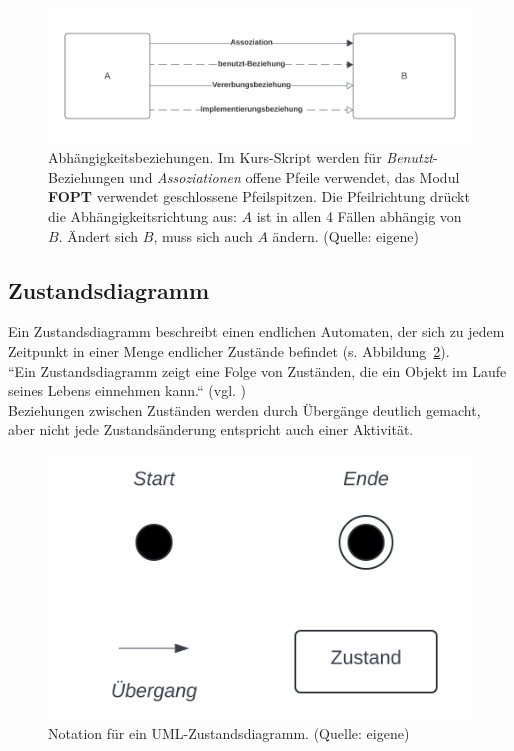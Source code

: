 \begin{figure}
    \centering
    \includegraphics[scale=0.4]{chapters/Anhang/CheatSheets/img/umldependencies}
    \caption{Abhängigkeitsbeziehungen. Im Kurs-Skript werden für \textit{Benutzt}-Beziehungen und \textit{Assoziationen} offene Pfeile verwendet, das Modul \textbf{FOPT} verwendet geschlossene Pfeilspitzen.
    Die Pfeilrichtung drückt die Abhängigkeitsrichtung aus: $A$ ist in allen 4 Fällen abhängig von $B$. Ändert sich $B$, muss sich auch $A$ ändern. (Quelle: eigene)}
    \label{fig:umldependencies}
\end{figure}


\subsection*{Zustandsdiagramm}
Ein Zustandsdiagramm beschreibt einen endlichen Automaten, der sich zu jedem Zeitpunkt in einer Menge endlicher Zustände befindet (s. Abbildung~\ref{fig:zustandsdiagramm}).\\
``Ein Zustandsdiagramm zeigt eine Folge von Zuständen, die ein Objekt im Laufe seines Lebens einnehmen kann.`` (vgl. \cite[391]{Oes05})\\

\noindent
Beziehungen zwischen Zuständen werden durch Übergänge deutlich gemacht, aber nicht jede Zustandsänderung entspricht auch einer Aktivität.


\begin{figure}
    \centering
    \includegraphics[scale=0.4]{chapters/Anhang/CheatSheets/img/zustandsdiagramm}
    \caption{Notation für ein UML-Zustandsdiagramm. (Quelle: eigene)}
    \label{fig:zustandsdiagramm}
\end{figure}


